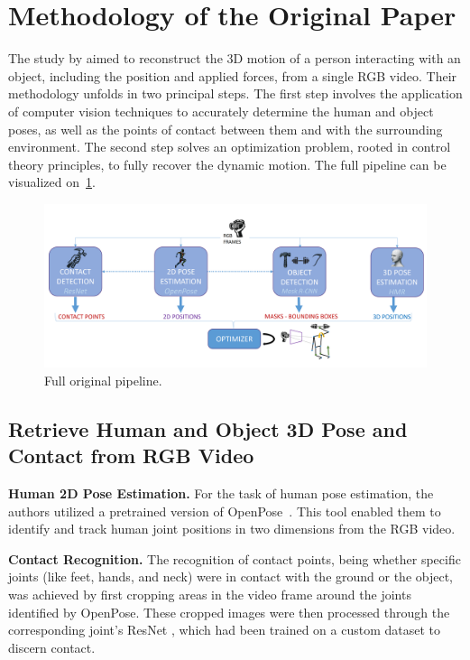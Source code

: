 \section{Methodology of the Original Paper}
\label{sec:methodo_paper}

The study by \citet{li2019estimating} aimed to reconstruct the 3D motion of a person interacting with an object, including the position 
and applied forces, from a single RGB video. Their methodology unfolds in two principal steps. The first step involves the application of 
computer vision techniques to accurately determine the human and object poses, as well as the points of contact between them and with the 
surrounding environment. The second step solves an optimization problem, rooted in control theory principles, to fully recover 
the dynamic motion. The full pipeline can be visualized on~\cref{fig:original_pipeline}.

\begin{figure}
    \centering
    \includegraphics[width=12cm]{figures/authors_original_pipeline.png}
    \caption{Full original pipeline.}
    \label{fig:original_pipeline}
\end{figure}


\subsection{Retrieve Human and Object 3D Pose and Contact from RGB Video}
\label{subsec:retrieve_original}

\noindent\textbf{Human 2D Pose Estimation.}\label{2dpose} For the task of human pose estimation, the authors utilized a pretrained version of 
OpenPose~\cite{cao2017realtime}. This tool enabled them to identify and track human joint positions in two dimensions from the RGB video.

\noindent\textbf{Contact Recognition.} The recognition of contact points, being whether specific joints (like feet, hands, and neck) were in 
contact with the ground or the object, was achieved by first cropping areas in the video frame around the joints identified by OpenPose. 
These cropped images were then processed through the corresponding joint's ResNet \cite{he2016deep}, which had been trained on a custom dataset 
to discern contact.

